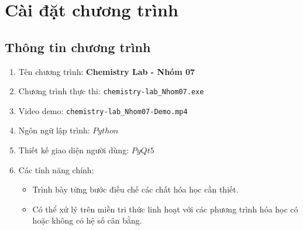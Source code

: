 \documentclass[a4paper]{article}
\begin{document}
	\section{Cài đặt chương trình}
	\subsection{Thông tin chương trình}
		\begin{enumerate}
			\item Tên chương trình: \textbf{Chemistry Lab - Nhóm 07}
			\item Chương trình thực thi: \texttt{chemistry-lab\_Nhom07.exe}
			\item Video demo: \texttt{chemistry-lab\_Nhom07-Demo.mp4}
			\item Ngôn ngữ lập trình: $Python$
			\item Thiết kế giao diện người dùng: $PyQt5$
			\item Các tính năng chính:
			\begin{itemize}
				\item Trình bày từng bước điều chế các chất hóa học cần thiết.
				\item Có thể xử lý trên miền tri thức linh hoạt với các phương trình hóa học có hoặc không có hệ số cân bằng.
			\end{itemize}
		\end{enumerate}
	
\end{document}

